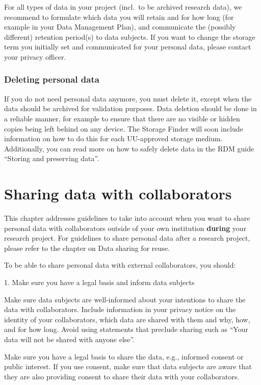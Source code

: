 \documentclass[
]{book}
\begin{document}
For all types of data in your project (incl.~to be archived research data), we
recommend to formulate which data you will retain and for how long (for example
in your Data Management Plan), and communicate the (possibly different)
retention period(s) to data subjects. If you want to change the storage term you
initially set and communicated for your personal data, please contact your
privacy officer.

\hypertarget{deleting-personal-data}{%
\subsection{Deleting personal data}\label{deleting-personal-data}}

If you do not need personal data anymore, you must delete it, except when the data
should be archived for validation purposes. Data deletion should be done in a
reliable manner, for example to ensure that there are no visible or hidden copies
being left behind on any device. The Storage Finder will soon include information on how to do
this for each UU-approved storage medium. Additionally, you can read more on
how to safely delete data in the RDM guide ``Storing and preserving data''.

\hypertarget{data-sharing-collaboration}{%
\chapter{Sharing data with collaborators}\label{data-sharing-collaboration}}

This chapter addresses guidelines to take into account when you want to share
personal data with collaborators outside of your own institution \textbf{during}
your research project. For guidelines to share personal data after a research
project, please refer to the chapter on
Data sharing for reuse.

To be able to share personal data with external collaborators, you should:

1. Make sure you have a legal basis and
inform data subjects

Make sure data subjects are well-informed about your intentions to
share the data with collaborators. Include information in your
privacy notice on the identity of your
collaborators, which data are shared with them and why, how, and for how
long. Avoid using statements that preclude sharing such as ``Your data
will not be shared with anyone else''.

Make sure you have a legal basis to
share the data, e.g., informed consent or public interest. If you use
consent, make sure that data subjects are aware that they are also
providing consent to share their data with your collaborators.
\end{document}
